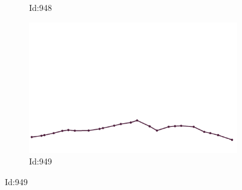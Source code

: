 \documentclass[12pt,twoside]{report}
\begin{document}
\begin{figure}
\begin{subfigure}[b]{0.20\textwidth}
\caption{Id:948}
\end{subfigure}
\begin{subfigure}[b]{0.20\textwidth}
\centering
\includegraphics[width=\textwidth]{../../trajectories/949.png}
\caption{Id:949}
\end{subfigure}
\end{figure}
\end{document}
